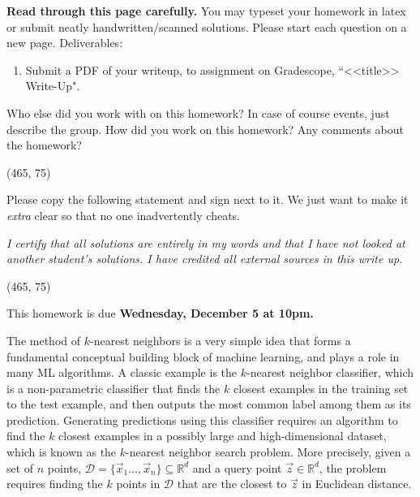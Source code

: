 \documentclass[preview]{standalone}
\begin{document}
\fontsize{12}{15}\selectfont


\textbf{Read through this page carefully.} You may typeset your homework in latex or submit neatly handwritten/scanned solutions. Please start each question on a new page. Deliverables:

\begin{enumerate}
  \item Submit a PDF of your writeup, 
  to assignment on Gradescope, ``<<title>> Write-Up". 
\end{enumerate}


\begin{Parts}

\Part Who else did you work with on this homework? In case of course events, just describe the group. How did you work on this homework? Any comments about the homework?

\vspace{15pt}
\framebox(465, 75){}

\Part Please copy the following statement and sign next to it. We just want to make it \textit{extra} clear so that no one inadvertently cheats.

\textit{I certify that all solutions are entirely in my words and that I have not looked at another student's solutions. I have credited all external sources in this write up.}

\vspace{15pt}
\framebox(465, 75){}

\end{Parts}

\pagebreak

This homework is due \textbf{Wednesday, December 5 at 10pm.}

The method of $k$-nearest neighbors is a very simple idea that forms a fundamental conceptual building block of machine learning, and plays a role in many ML algorithms. A classic example is the $k$-nearest
neighbor classifier, which is a non-parametric classifier that finds the $k$ closest examples in the training set to the test example, and then outputs the most common label among them as its prediction. Generating predictions using this classifier requires an algorithm to find the $k$ closest examples in a possibly large and high-dimensional dataset, which is known as the $k$-nearest neighbor search problem. More precisely, given a set of $n$ points, $\mathcal{D}=\{\vec{x}_{1}\ldots,\vec{x}_{n}\}\subseteq\mathbb{R}^{d}$ and a query point $\vec{z}\in\mathbb{R}^{d}$, the problem requires finding the $k$ points in $\mathcal{D}$ that are the closest to $\vec{z}$ in Euclidean distance.
\end{document}

